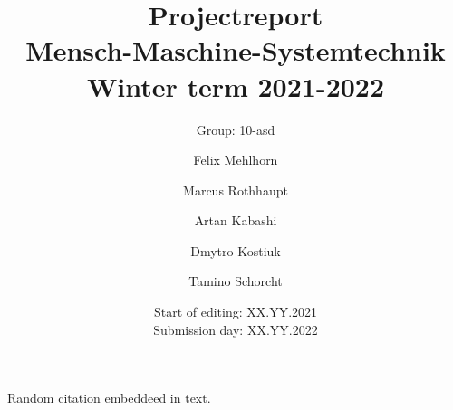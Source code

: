 \documentclass[	
	british,
	cdgeometry=true, %
	headingsvskip=-2.5cm, %
	cdhead=nocolor, %
	cdhead=nodate, %
	cdfont=true,
	ddc=false, %
	parskip=true,
	titlepage=true
]{tudscrartcl}
\begin{document}
\lstset{language=Matlab}


\title{Projectreport\\
		Mensch-Maschine-Systemtechnik\\
		Winter term 2021-2022\vspace{20mm}
		}
		
\newcommand{\Gruppennummer}{10}
\newcommand{\Gruppentitel}{asd}

\subtitle{Group: \Gruppennummer\space-\space\Gruppentitel \vspace{20mm}}

\date{Start of editing: \hspace{15mm} XX.YY.2021 \\
		  Submission day: \hspace{13.5mm} XX.YY.2022}

\author{Felix Mehlhorn
	\and
	Marcus Rothhaupt
	\and
	Artan Kabashi
	\and
	Dmytro Kostiuk
	\and
	Tamino Schorcht}
	
\maketitle


\tableofcontents
\newpage



\newpage



\newpage



\newpage



\newpage



\newpage



\newpage



\newpage



\newpage

Random citation \cite{DUMMY:1} embeddeed in text.



\end{document}
